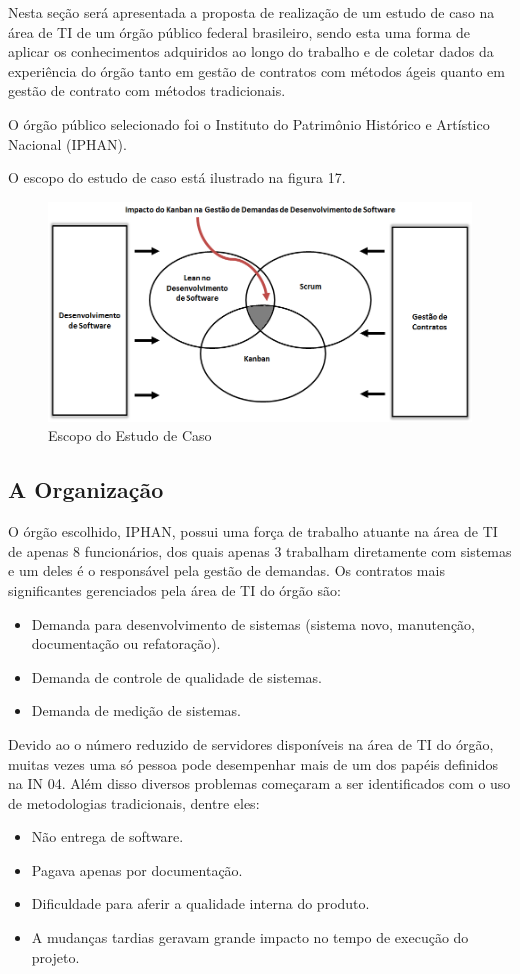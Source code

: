 Nesta seção será apresentada a proposta de realização de um estudo de caso na área de TI de um órgão público federal brasileiro, sendo esta uma forma de aplicar os conhecimentos adquiridos ao longo do trabalho e de coletar dados da experiência do órgão tanto em gestão de contratos com métodos ágeis quanto em gestão de contrato com métodos tradicionais.

O órgão público selecionado foi o Instituto do Patrimônio Histórico e Artístico Nacional (IPHAN).

O escopo do estudo de caso está ilustrado na figura 17. 
\begin{figure}[h]
		\centering
		\label{fig01}
			\includegraphics[scale=0.6]{figuras/escopoEC.png}
		\caption{Escopo do Estudo de Caso}
\end{figure}

\subsection[A Organização]{A Organização}

O órgão escolhido, IPHAN, possui uma força de trabalho atuante na área de TI de apenas 8 funcionários, dos quais apenas 3 trabalham diretamente com sistemas e um deles é o responsável pela gestão de demandas. Os contratos mais significantes gerenciados pela área de TI do órgão são:
\begin{itemize}
\item Demanda para desenvolvimento de sistemas (sistema novo, manutenção, documentação ou refatoração).
\item Demanda de controle de qualidade de sistemas.
\item Demanda de medição de sistemas.
\end{itemize}

Devido ao o número reduzido de servidores disponíveis na área de TI do órgão, muitas vezes uma só pessoa pode desempenhar mais de um dos papéis definidos na IN 04. Além disso diversos problemas começaram a ser identificados com o uso de metodologias tradicionais, dentre eles:
\begin{itemize}
\item Não entrega de software.
\item Pagava apenas por documentação.
\item Dificuldade para aferir a qualidade interna do produto.
\item A mudanças tardias geravam grande impacto no tempo de execução do projeto.
\end{itemize}

